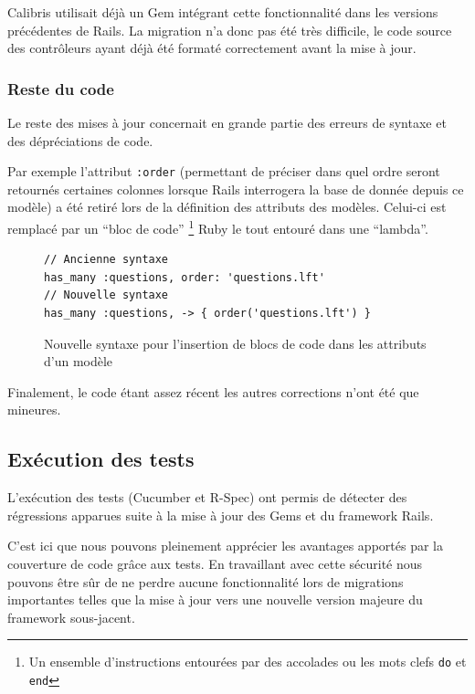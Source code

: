 \documentclass[12pt,a4paper]{book}
\begin{document}
Calibris utilisait déjà un Gem intégrant cette fonctionnalité dans les versions précédentes de Rails. La migration n'a donc pas été très difficile, le code source des contrôleurs ayant déjà été formaté correctement avant la mise à jour.
    
\subsubsection{Reste du code}

Le reste des mises à jour concernait en grande partie des erreurs de syntaxe et des dépréciations de code.

Par exemple l'attribut \texttt{:order} (permettant de préciser dans quel ordre seront retournés certaines colonnes lorsque Rails interrogera la base de donnée depuis ce modèle) a été retiré lors de la définition des attributs des modèles. Celui-ci est remplacé par un ``bloc de code'' \footnote{Un ensemble d'instructions entourées par des accolades ou les mots clefs \texttt{do} et \texttt{end}} Ruby le tout entouré dans une ``lambda''.

    \begin{figure}[h]
    \lstset{language=ruby}
    \begin{lstlisting}
// Ancienne syntaxe
has_many :questions, order: 'questions.lft'
// Nouvelle syntaxe
has_many :questions, -> { order('questions.lft') }
    \end{lstlisting}
     \caption{Nouvelle syntaxe pour l'insertion de blocs de code dans les attributs d'un modèle}
    \end{figure}
    
Finalement, le code étant assez récent les autres corrections n'ont été que mineures.

\subsection{Exécution des tests}

L'exécution des tests (Cucumber et R-Spec) ont permis de détecter des régressions apparues suite à la mise à jour des Gems et du framework Rails.

C'est ici que nous pouvons pleinement apprécier les avantages apportés par la couverture de code grâce aux tests. En travaillant avec cette sécurité nous pouvons être sûr de ne perdre aucune fonctionnalité lors de migrations importantes telles que la mise à jour vers une nouvelle version majeure du framework sous-jacent.
\end{document}

